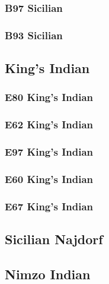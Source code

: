 \documentclass[]{book}
\begin{document}
\hypertarget{b97-sicilian}{%
\subsubsection{B97 Sicilian}\label{b97-sicilian}}

\hypertarget{b93-sicilian}{%
\subsubsection{B93 Sicilian}\label{b93-sicilian}}

\hypertarget{kings-indian}{%
\subsection{King's Indian}\label{kings-indian}}

\hypertarget{e80-kings-indian}{%
\subsubsection{E80 King's Indian}\label{e80-kings-indian}}

\hypertarget{e62-kings-indian}{%
\subsubsection{E62 King's Indian}\label{e62-kings-indian}}

\hypertarget{e97-kings-indian}{%
\subsubsection{E97 King's Indian}\label{e97-kings-indian}}

\hypertarget{e60-kings-indian}{%
\subsubsection{E60 King's Indian}\label{e60-kings-indian}}

\hypertarget{e67-kings-indian}{%
\subsubsection{E67 King's Indian}\label{e67-kings-indian}}

\hypertarget{sicilian-najdorf}{%
\subsection{Sicilian Najdorf}\label{sicilian-najdorf}}

\hypertarget{nimzo-indian}{%
\subsection{Nimzo Indian}\label{nimzo-indian}}
\end{document}
